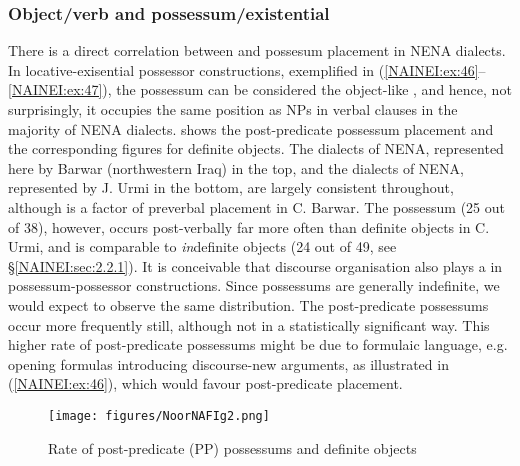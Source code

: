 \documentclass[output=paper,colorlinks,citecolor=brown,draftmode]{langscibook}
\begin{document}
\subsubsection{Object/verb and possessum/existential}\label{NAINEI:sec:3.2.1}
There is a direct correlation between  and possesum placement in NENA dialects. In locative-exisential possessor constructions, exemplified in (\ref{NAINEI:ex:46}--\ref{NAINEI:ex:47}), the possessum can be considered the object-like , and hence, not surprisingly, it occupies the same position as  NPs in verbal clauses in the majority of NENA dialects.  shows the post-predicate possessum placement and the corresponding figures for definite objects. The  dialects of NENA, represented here by Barwar (northwestern Iraq) in the top, and the  dialects of NENA, represented by J. Urmi in the bottom, are largely consistent throughout, although  is a factor of preverbal  placement in C. Barwar. The possessum (25 out of 38), however, occurs post-verbally far more often than definite objects in C. Urmi, and is comparable to \textit{in}definite objects (24 out of 49, see §\ref{NAINEI:sec:2.2.1}). It is conceivable that discourse organisation also plays a  in possessum-possessor constructions. Since possessums are generally indefinite, we would expect to observe the same distribution. The post-predicate possessums occur more frequently still, although not in a statistically significant way. This higher rate of post-predicate possessums might be due to formulaic language, e.g. opening formulas introducing discourse-new arguments, as illustrated in (\ref{NAINEI:ex:46}), which would favour post-predicate placement.

\begin{figure}[t]
        \texttt{[image: figures/NoorNAFIg2.png]}
    \caption{Rate of post-predicate (PP) possessums and definite objects}
    \label{NAINEI:fig:2}
\end{figure}
\end{document}
